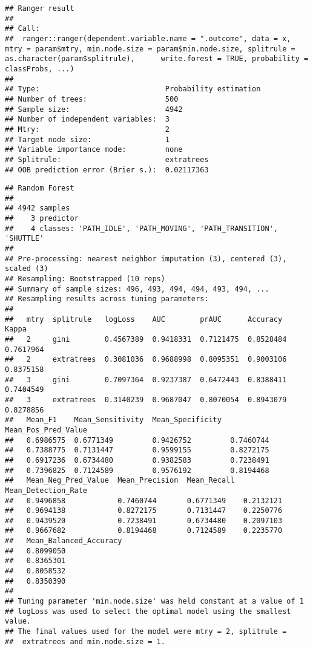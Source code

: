 \documentclass[]{article}
\begin{document}
\begin{verbatim}
## Ranger result
## 
## Call:
##  ranger::ranger(dependent.variable.name = ".outcome", data = x,      mtry = param$mtry, min.node.size = param$min.node.size, splitrule = as.character(param$splitrule),      write.forest = TRUE, probability = classProbs, ...) 
## 
## Type:                             Probability estimation 
## Number of trees:                  500 
## Sample size:                      4942 
## Number of independent variables:  3 
## Mtry:                             2 
## Target node size:                 1 
## Variable importance mode:         none 
## Splitrule:                        extratrees 
## OOB prediction error (Brier s.):  0.02117363
\end{verbatim}

\begin{verbatim}
## Random Forest 
## 
## 4942 samples
##    3 predictor
##    4 classes: 'PATH_IDLE', 'PATH_MOVING', 'PATH_TRANSITION', 'SHUTTLE' 
## 
## Pre-processing: nearest neighbor imputation (3), centered (3), scaled (3) 
## Resampling: Bootstrapped (10 reps) 
## Summary of sample sizes: 496, 493, 494, 494, 493, 494, ... 
## Resampling results across tuning parameters:
## 
##   mtry  splitrule   logLoss    AUC        prAUC      Accuracy   Kappa    
##   2     gini        0.4567389  0.9418331  0.7121475  0.8528484  0.7617964
##   2     extratrees  0.3081036  0.9688998  0.8095351  0.9003106  0.8375158
##   3     gini        0.7097364  0.9237387  0.6472443  0.8388411  0.7404549
##   3     extratrees  0.3140239  0.9687047  0.8070054  0.8943079  0.8278856
##   Mean_F1    Mean_Sensitivity  Mean_Specificity  Mean_Pos_Pred_Value
##   0.6986575  0.6771349         0.9426752         0.7460744          
##   0.7388775  0.7131447         0.9599155         0.8272175          
##   0.6917236  0.6734480         0.9382583         0.7238491          
##   0.7396825  0.7124589         0.9576192         0.8194468          
##   Mean_Neg_Pred_Value  Mean_Precision  Mean_Recall  Mean_Detection_Rate
##   0.9496858            0.7460744       0.6771349    0.2132121          
##   0.9694138            0.8272175       0.7131447    0.2250776          
##   0.9439520            0.7238491       0.6734480    0.2097103          
##   0.9667682            0.8194468       0.7124589    0.2235770          
##   Mean_Balanced_Accuracy
##   0.8099050             
##   0.8365301             
##   0.8058532             
##   0.8350390             
## 
## Tuning parameter 'min.node.size' was held constant at a value of 1
## logLoss was used to select the optimal model using the smallest value.
## The final values used for the model were mtry = 2, splitrule =
##  extratrees and min.node.size = 1.
\end{verbatim}
\end{document}
